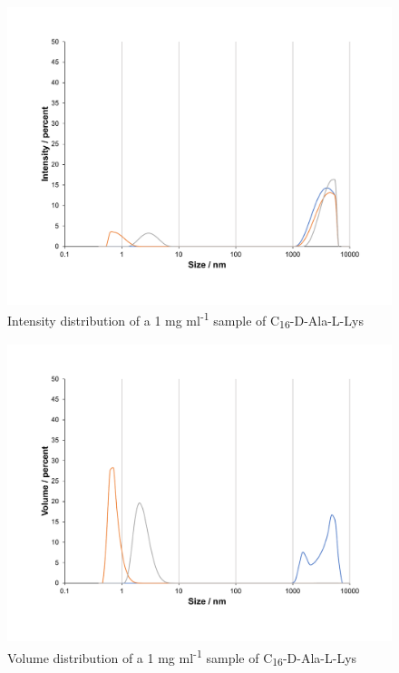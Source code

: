\newpage
\begin{figure} [ht!]
\centering
\includegraphics[scale=0.47]{DLS/KAT1_22_1_0mg_ml-1_size.pdf}
\caption{Intensity distribution of a 1 mg ml\textsuperscript{-1} sample of C\textsubscript{16}-D-Ala-L-Lys}
\label{intensity_distribution_KAT1.22}
\end{figure}
\begin{figure} [ht!]
\centering
\includegraphics[scale=0.47]{DLS/KAT1_22_1_0mg_ml-1_volume.pdf}
\caption{Volume distribution of a 1 mg ml\textsuperscript{-1} sample of C\textsubscript{16}-D-Ala-L-Lys}
\label{volume_distribution_KAT1.22}
\end{figure}

